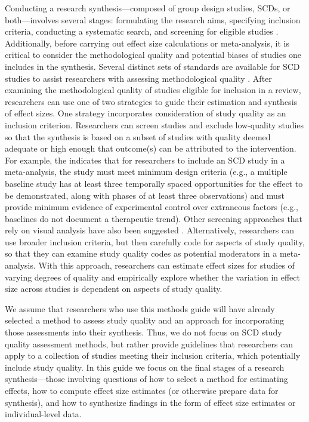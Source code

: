 \documentclass[
]{book}
\begin{document}
Conducting a research synthesis---composed of group design studies, SCDs, or both---involves several stages: formulating the research aims, specifying inclusion criteria, conducting a systematic search, and screening for eligible studies \citep{cooper2010Research, pustejovsky2017Research}.
Additionally, before carrying out effect size calculations or meta-analysis, it is critical to consider the methodological quality and potential biases of studies one includes in the synthesis.
Several distinct sets of standards are available for SCD studies to assist researchers with assessing methodological quality \citep[e.g.,][]{kratochwill2013SingleCase, kratochwill2021Singlecase, reichow2018Development, tate2016SingleCase, zimmerman2018Singlecase}.
After examining the methodological quality of studies eligible for inclusion in a review, researchers can use one of two strategies to guide their estimation and synthesis of effect sizes.
One strategy incorporates consideration of study quality as an inclusion criterion.
Researchers can screen studies and exclude low-quality studies so that the synthesis is based on a subset of studies with quality deemed adequate or high enough that outcome(s) can be attributed to the intervention.
For example, the \citet{WWC2022} indicates that for researchers to include an SCD study in a meta-analysis, the study must meet minimum design criteria (e.g., a multiple baseline study has at least three temporally spaced opportunities for the effect to be demonstrated, along with phases of at least three observations) and must provide minimum evidence of experimental control over extraneous factors (e.g., baselines do not document a therapeutic trend).
Other screening approaches that rely on visual analysis have also been suggested \citep{kratochwill2021Singlecase, maggin2021Commentary}.
Alternatively, researchers can use broader inclusion criteria, but then carefully code for aspects of study quality, so that they can examine study quality codes as potential moderators in a meta-analysis.
With this approach, researchers can estimate effect sizes for studies of varying degrees of quality and empirically explore whether the variation in effect size across studies is dependent on aspects of study quality.

We assume that researchers who use this methods guide will have already selected a method to assess study quality and an approach for incorporating those assessments into their synthesis.
Thus, we do not focus on SCD study quality assessment methods, but rather provide guidelines that researchers can apply to a collection of studies meeting their inclusion criteria, which potentially include study quality.
In this guide we focus on the final stages of a research synthesis---those involving questions of how to select a method for estimating effects, how to compute effect size estimates (or otherwise prepare data for synthesis), and how to synthesize findings in the form of effect size estimates or individual-level data.
\end{document}
